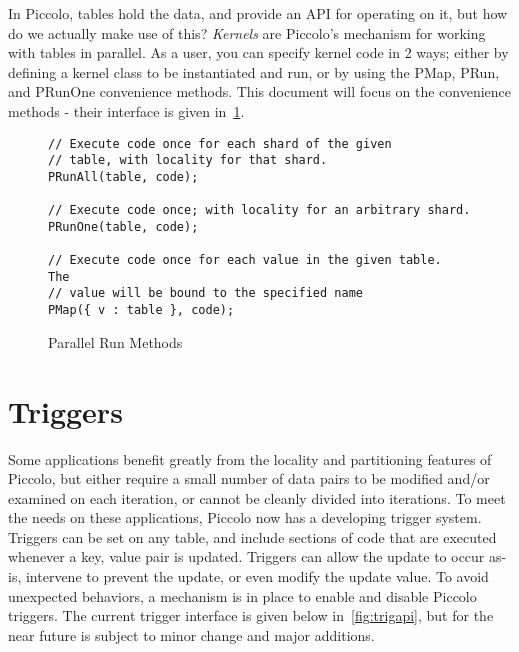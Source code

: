 \documentclass[10pt]{article}
\newcommand{\p}{Piccolo\xspace}
\begin{document}
In \p, tables hold the data, and provide an API for operating on it, but how do
we actually make use of this?  {\em Kernels} are \p's mechanism for working with
tables in parallel.  As a user, you can specify kernel code in 2 ways; either by
defining a kernel class to be instantiated and run, or by using the PMap, PRun,
and PRunOne convenience methods.  This document will focus on the convenience
methods - their interface is given in~\ref{fig:methodapi}.

 \begin{figure}[h!]
\begin{lstlisting}
// Execute code once for each shard of the given 
// table, with locality for that shard.
PRunAll(table, code);

// Execute code once; with locality for an arbitrary shard.
PRunOne(table, code);

// Execute code once for each value in the given table.  The
// value will be bound to the specified name
PMap({ v : table }, code);
\end{lstlisting}
\caption{\sffamily Parallel Run Methods}
\label{fig:methodapi}
\end{figure}

\section{Triggers}
Some applications benefit greatly from the locality and partitioning features of
\p, but either require a small number of data pairs to be modified and/or
examined on each iteration, or cannot be cleanly divided into iterations. To meet
the needs on these applications, \p now has a developing trigger system.  Triggers
can be set on any table, and include sections of code that are executed whenever
a key, value pair is updated.  Triggers can allow the update to occur as-is,
intervene to prevent the update, or even modify the update value.  To avoid
unexpected behaviors, a mechanism is in place to enable and disable Piccolo
triggers.  The current trigger interface is given below in~\ref{fig:trigapi}, but
for the near future is subject to minor change and major additions.
\end{document}
